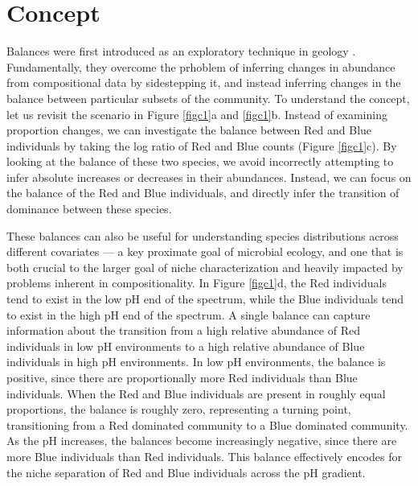 \section{Concept}
Balances were first introduced as an exploratory technique in geology \cite{groups_of_parts, coda_dendrogram}. Fundamentally, they overcome the prhoblem of inferring changes in abundance from compositional data by sidestepping it, and instead inferring changes in the balance between particular subsets of the community. To understand the concept, let us revisit the scenario in Figure \ref{figc1}a and \ref{figc1}b.  Instead of examining proportion changes, we can investigate the balance between Red and Blue individuals by taking the log ratio of Red and Blue counts (Figure \ref{figc1}c).  By looking at the balance of these two species, we avoid incorrectly attempting to infer absolute increases or decreases in their abundances.  Instead, we can focus on the balance of the Red and Blue individuals, and directly infer the transition of dominance between these species.\par
These balances can also be useful for understanding species distributions across different covariates — a key proximate goal of microbial ecology, and one that is both crucial to the larger goal of niche characterization and heavily impacted by problems inherent in compositionality.  In Figure \ref{figc1}d, the Red individuals tend to exist in the low pH end of the spectrum, while the Blue individuals tend to exist in the high pH end of the spectrum.  A single balance can capture information about the transition from a high relative abundance of Red individuals in low pH environments to a high relative abundance of Blue individuals in high pH environments.  In low pH environments, the balance is positive, since there are proportionally more Red individuals than Blue individuals.  When the Red and Blue individuals are present in roughly equal proportions, the balance is roughly zero, representing a turning point, transitioning from a Red dominated community to a Blue dominated community.  As the pH increases, the balances become increasingly negative, since there are more Blue individuals than Red individuals. This balance effectively encodes for the niche separation of Red and Blue individuals across the pH gradient. \par
